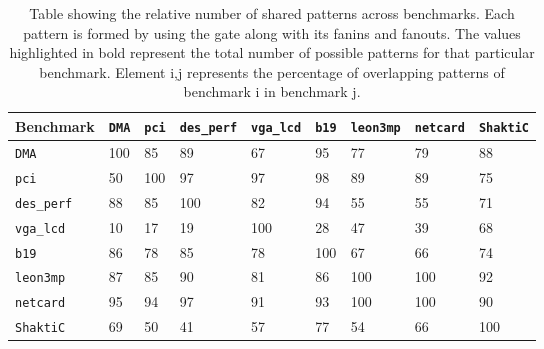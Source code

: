\begin{table}[!t]
\centering
    \caption{Table showing the relative number of shared patterns across benchmarks. Each pattern is formed by using the gate along with its fanins and fanouts. The values highlighted in bold represent the total number of possible patterns for that particular benchmark.  Element i,j represents the percentage of overlapping patterns of benchmark i in benchmark j.}
    \label{Tab:tab13}

    \begin{tabular}{ |p{2.2cm}| p{1cm}| p{1.2cm}| p{1.7cm} |p{1.4cm} | p{1.2cm}|p{1.4cm}|p{1.4cm}|p{1.4cm}|}
\hline
        \textbf{ Benchmark} & \texttt{DMA} & \texttt{pci} &\texttt{des\_perf} &\texttt{vga\_lcd} &\texttt{b19} &\texttt{leon3mp} &\texttt{netcard} & \texttt{ShaktiC} \\ \hline
   \texttt{DMA}       & 100 & 85  & 89  & 67  & 95  & 77  & 79  & 88  \\ \hline
\texttt{pci}       & 50  & 100 & 97  & 97  & 98  & 89  & 89  & 75  \\ \hline
\texttt{des\_perf} & 88  & 85  & 100 & 82  & 94  & 55  & 55  & 71  \\ \hline
\texttt{vga\_lcd}  & 10  & 17  & 19  & 100 & 28  & 47  & 39  & 68  \\ \hline
\texttt{b19}       & 86  & 78  & 85  & 78  & 100 & 67  & 66  & 74  \\ \hline
\texttt{leon3mp}   & 87  & 85  & 90  & 81  & 86  & 100 & 100 & 92  \\ \hline
\texttt{netcard}   & 95  & 94  & 97  & 91  & 93  & 100 & 100 & 90  \\ \hline
\texttt{ShaktiC}   & 69  & 50  & 41  & 57  & 77  & 54  & 66  & 100 \\ \hline 
 \end{tabular}
    
\centering

\end{table}



